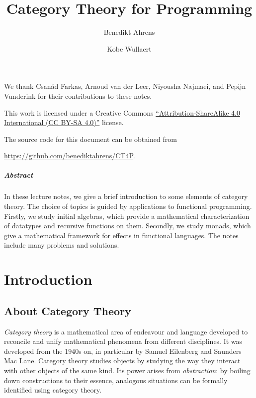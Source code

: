 \documentclass[a4paper,11pt, oneside,titlepage=false]{scrbook}
\title{Category Theory for Programming}
\author{Benedikt Ahrens \and Kobe Wullaert}
\date{}
\theoremstyle{plain}
\theoremstyle{definition}
\begin{document}
\maketitle

\vspace*{\fill}
We thank Csanád Farkas, Arnoud van der Leer, Niyousha Najmaei, and Pepijn Vunderink for their contributions to these notes.
\vspace*{\fill}


\noindent
This work is licensed under a Creative Commons \href{https://creativecommons.org/licenses/by-sa/4.0/}{``Attribution-ShareAlike 4.0 International (CC BY-SA 4.0)''} license. \href{https://creativecommons.org/licenses/by-sa/4.0/}{\ccbysa}

\noindent
The source code for this document can be obtained from
\begin{center}
\url{https://github.com/benediktahrens/CT4P}.
\end{center}

\newpage

\paragraph*{Abstract}
In these lecture notes, we give a brief introduction to some elements of category theory.
The choice of topics is guided by applications to functional programming.
Firstly, we study initial algebras, which provide a mathematical characterization of datatypes and recursive functions on them.
Secondly, we study monads, which give a mathematical framework for effects in functional languages.
The notes include many problems and solutions.

\newpage
\tableofcontents
\newpage


\chapter{Introduction}

\section{About Category Theory}
\emph{Category theory} is a mathematical area of endeavour and language developed to reconcile and unify mathematical phenomena from different disciplines.
It was developed from the 1940s on, in particular by Samuel Eilenberg and Saunders Mac Lane.
Category theory studies objects by studying the way they interact with other objects of the same kind.
Its power arises from \emph{abstraction}:
by boiling down constructions to their essence, analogous situations can be formally identified using category theory.
\end{document}
